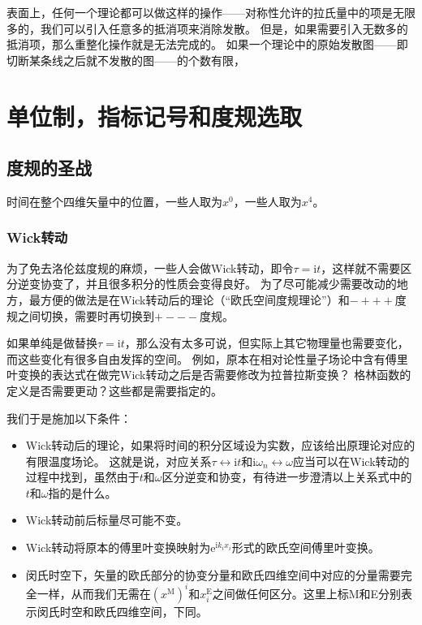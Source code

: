 \documentclass[hyperref, UTF8, a4paper]{ctexart}
\newcommand*{\ii}{\mathrm{i}}
\newcommand*{\ee}{\mathrm{e}}
\begin{document}
表面上，任何一个理论都可以做这样的操作——对称性允许的拉氏量中的项是无限多的，我们可以引入任意多的抵消项来消除发散。
但是，如果需要引入无数多的抵消项，那么重整化操作就是无法完成的。
如果一个理论中的原始发散图——即切断某条线之后就不发散的图——的个数有限，

\section{单位制，指标记号和度规选取}

\subsection{度规的圣战}

时间在整个四维矢量中的位置，一些人取为$x^0$，一些人取为$x^4$。

\subsubsection{Wick转动}

为了免去洛伦兹度规的麻烦，一些人会做Wick转动，即令$\tau=\ii t$，这样就不需要区分逆变协变了，并且很多积分的性质会变得良好。
为了尽可能减少需要改动的地方，最方便的做法是在Wick转动后的理论（“欧氏空间度规理论”）和$-+++$度规之间切换，需要时再切换到$+---$度规。

如果单纯是做替换$\tau = \ii t$，那么没有太多可说，但实际上其它物理量也需要变化，而这些变化有很多自由发挥的空间。
例如，原本在相对论性量子场论中含有傅里叶变换的表达式在做完Wick转动之后是否需要修改为拉普拉斯变换？
格林函数的定义是否需要更动？这些都是需要指定的。

我们于是施加以下条件：
\begin{itemize}
    \item Wick转动后的理论，如果将时间的积分区域设为实数，应该给出原理论对应的有限温度场论。
    这就是说，对应关系$\tau \leftrightarrow \ii t$和$\ii \omega_n \leftrightarrow \omega$应当可以在Wick转动的过程中找到，虽然由于$t$和$\omega$区分逆变和协变，有待进一步澄清以上关系式中的$t$和$\omega$指的是什么。
    \item Wick转动前后标量尽可能不变。
    \item Wick转动将原本的傅里叶变换映射为$\ee^{\ii k_i x_i}$形式的欧氏空间傅里叶变换。
    \item 闵氏时空下，矢量的欧氏部分的协变分量和欧氏四维空间中对应的分量需要完全一样，从而我们无需在$(x^\text{M})^i$和$x^\text{E}_i$之间做任何区分。这里上标M和E分别表示闵氏时空和欧氏四维空间，下同。
\end{itemize}
\end{document}
